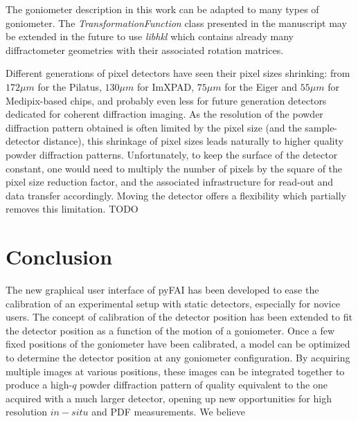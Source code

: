 \documentclass[preprint]{iucr}              %
\begin{document}
The goniometer description in this work can be adapted to
many types of goniometer.
The \textit{TransformationFunction} class presented in the manuscript may be extended
in the future to use \textit{libhkl} \cite{libhkl} which contains already many
diffractometer geometries with their associated rotation matrices. 

Different generations of pixel detectors have seen their pixel sizes
shrinking:
from $172 \mu m$ for the Pilatus, $130 \mu m$ for ImXPAD, $75 \mu m$ for the
Eiger and $55 \mu m$ for Medipix-based chips, and probably even less for
future generation detectors dedicated for coherent diffraction imaging.
As the resolution of the powder diffraction pattern obtained is often limited by the
pixel size (and the sample-detector distance), this shrinkage of
pixel sizes leads naturally to higher quality powder
diffraction patterns.
Unfortunately, to keep the surface of the detector constant, one would need
to multiply the number of pixels by the square of the pixel size reduction
factor, and the associated infrastructure for read-out and data transfer
accordingly.
Moving the detector offers a flexibility which partially removes this
limitation.
TODO

\section{Conclusion}

The new graphical user interface of pyFAI has been developed to ease the
calibration of an experimental setup with static detectors, especially for
novice users.
The concept of calibration of the detector position has been extended to fit
the detector position as a function of the motion of a goniometer.   
Once a few fixed positions of the goniometer have been calibrated, a model can
be optimized to determine the detector position at any goniometer
configuration.
By acquiring multiple images at various positions, these images can be
integrated together to produce a high-$q$ powder diffraction pattern of
quality equivalent to the one acquired with a much larger detector, opening 
up new opportunities for high resolution $in-situ$ and PDF measurements. 
We believe 
 
\end{document}
